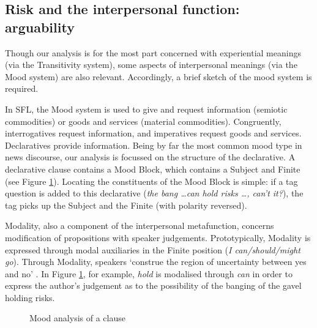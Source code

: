 
	\subsection{Risk and the interpersonal function: arguability}

		Though our analysis is for the most part concerned with experiential meanings (via the Transitivity system), some aspects of interpersonal meanings (via the Mood system) are also relevant. Accordingly, a brief sketch of the mood system is required.

		In SFL, the Mood system is used to give and request information (semiotic commodities) or goods and services (material commodities). Congruently, interrogatives request information, and imperatives request goods and services. Declaratives provide information. Being by far the most common mood type in news discourse, our analysis is focussed on the structure of the declarative. A declarative clause contains a Mood Block, which contains a Subject and Finite (see Figure \ref{fig:moodannotation}). Locating the constituents of the Mood Block is simple: if a tag question is added to this declarative (\emph{the bang \dots can hold risks \dots, can't it?}), the tag picks up the Subject and the Finite (with polarity reversed).

		Modality, also a component of the interpersonal metafunction, concerns modification of propositions with speaker judgements.
		Prototypically, Modality is expressed through modal auxiliaries in the Finite position (\emph{I can/should/might go}). Through Modality, speakers `construe the region of uncertainty between yes and no' \cite[p.~147]{halliday_introduction_2004}. In Figure \ref{fig:moodannotation}, for example, \emph{hold} is modalised through \emph{can} in order to express the author's judgement as to the possibility of the banging of the gavel holding risks.

			\begin{figure}[htb]
			\centering \footnotesize \onehalfspacing
			\caption{Mood analysis of a clause}
			    			\label{fig:moodannotation}
			\end{figure}

